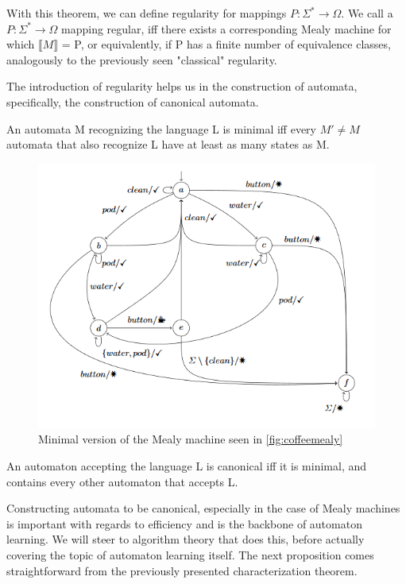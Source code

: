 With this theorem, we can define regularity for mappings $P:\Sigma^*\to\Omega$. We call a $P:\Sigma^*\to\Omega$ mapping regular, iff there exists a corresponding Mealy machine for which $\llbracket M\rrbracket$ = P, or equivalently, if P has a finite number of equivalence classes, analogously to the previously seen "classical" regularity.

The introduction of regularity helps us in the construction of automata, specifically, the construction of canonical automata. 

\begin{definition}
	An automata M recognizing the language L is minimal iff every $M'\neq M$ automata that also recognize L have at least as many states as M.
\end{definition}

\begin{figure}[H]
	\centering
	\includegraphics[width=0.7\linewidth]{include/coffeemealyminimal}
	\caption{Minimal version of the Mealy machine seen in \ref{fig:coffeemealy}}
	\label{fig:coffeemealyminimal}
\end{figure}


\begin{definition}
	An automaton accepting the language L is canonical iff it is minimal, and contains every other automaton that accepts L.
\end{definition}


Constructing automata to be canonical, especially in the case of Mealy machines is important with regards to efficiency and is the backbone of automaton learning. We will steer to algorithm theory that does this, before actually covering the topic of automaton learning itself. The next proposition comes straightforward from the previously presented characterization theorem.


